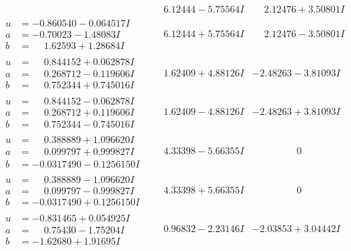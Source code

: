 \documentclass[1p]{elsarticle_modified}
\theoremstyle{definition}
\begin{document}
$$\begin{array}{c|c|c}
 & \phantom{-}6.12444 - 5.75564 I & \phantom{-}2.12476 + 3.50801 I \\ \hline\begin{aligned}
u &= -0.860540 - 0.064517 I \\
a &= -0.70023 - 1.48083 I \\
b &= \phantom{-}1.62593 + 1.28684 I\end{aligned}
 & \phantom{-}6.12444 + 5.75564 I & \phantom{-}2.12476 - 3.50801 I \\ \hline\begin{aligned}
u &= \phantom{-}0.844152 + 0.062878 I \\
a &= \phantom{-}0.268712 - 0.119606 I \\
b &= \phantom{-}0.752344 + 0.745016 I\end{aligned}
 & \phantom{-}1.62409 + 4.88126 I & -2.48263 - 3.81093 I \\ \hline\begin{aligned}
u &= \phantom{-}0.844152 - 0.062878 I \\
a &= \phantom{-}0.268712 + 0.119606 I \\
b &= \phantom{-}0.752344 - 0.745016 I\end{aligned}
 & \phantom{-}1.62409 - 4.88126 I & -2.48263 + 3.81093 I \\ \hline\begin{aligned}
u &= \phantom{-}0.388889 + 1.096620 I \\
a &= \phantom{-}0.099797 + 0.999827 I \\
b &= -0.0317490 - 0.1256150 I\end{aligned}
 & \phantom{-}4.33398 - 5.66355 I & \phantom{-0.000000 } 0 \\ \hline\begin{aligned}
u &= \phantom{-}0.388889 - 1.096620 I \\
a &= \phantom{-}0.099797 - 0.999827 I \\
b &= -0.0317490 + 0.1256150 I\end{aligned}
 & \phantom{-}4.33398 + 5.66355 I & \phantom{-0.000000 } 0 \\ \hline\begin{aligned}
u &= -0.831465 + 0.054925 I \\
a &= \phantom{-}0.75430 - 1.75204 I \\
b &= -1.62680 + 1.91695 I\end{aligned}
 & \phantom{-}0.96832 - 2.23146 I & -2.03853 + 3.04442 I \\ \hline\begin{aligned}

\end{aligned}
\end{array}$$
\end{document}
